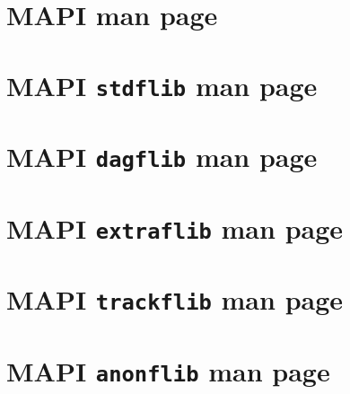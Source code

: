 \documentclass[a4paper, 11pt]{article}
\begin{document}
\appendix

\newpage
\section{MAPI man page}
\label{sec:manpage}

\begin{scriptsize}

\end{scriptsize}

\newpage
\section{MAPI {\tt stdflib} man page}
\label{sec:manstdflib}

\begin{scriptsize}

\end{scriptsize}

\newpage
\section{MAPI {\tt dagflib} man page}
\label{sec:mandagflib}

\begin{scriptsize}

\end{scriptsize}

\newpage
\section{MAPI {\tt extraflib} man page}
\label{sec:manextraflib}

\begin{scriptsize}

\end{scriptsize}

\newpage
\section{MAPI {\tt trackflib} man page}
\label{sec:mantrackflib}

\begin{scriptsize}

\end{scriptsize}

\newpage
\section{MAPI {\tt anonflib} man page}
\label{sec:mananonflib}

\begin{scriptsize}

\end{scriptsize}
\end{document}
